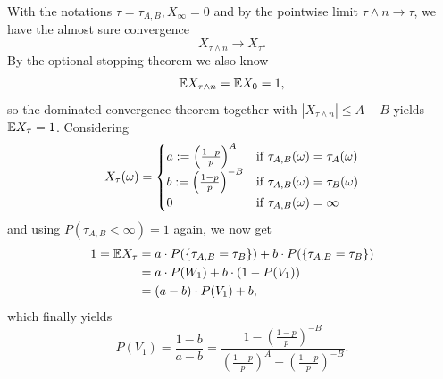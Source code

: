 \documentclass[12pt]{scrartcl}
\begin{document}
With the notations $\tau=\tau_{A,B}, X_{\infty}=0$ and by the pointwise limit $\tau\land n \rightarrow \tau$, we have the almost sure convergence
$$X_{\tau\land n}\rightarrow X_{\tau}.$$
By the optional stopping theorem we also know
$$\mathbb{E} X_{\tau\land n}=\mathbb{E} X_0 = 1,$$
so the dominated convergence theorem together with $|X_{\tau\land n}|\le A+B$ yields $\mathbb{E} X_{\tau}=1$.
Considering
$$X_{\tau}(\omega)=\begin{cases}
	a := \left(\frac{1-p}{p}\right)^A & \text{if } \tau_{A,B}(\omega)=\tau_A(\omega) \\
	b := \left(\frac{1-p}{p}\right)^{-B} & \text{if } \tau_{A,B}(\omega)=\tau_B(\omega) \\
	0 & \text{if } \tau_{A,B}(\omega)=\infty
\end{cases}$$
and using $P(\tau_{A,B}<\infty)=1$ again, we now get
\begin{align*}
1 = \mathbb{E} X_\tau
&= a\cdot P(\{\tau_{A,B}=\tau_B\}) + b\cdot P(\{\tau_{A,B}=\tau_B\}) \\
&= a\cdot P(W_1)+ b\cdot (1-P(V_1)) \\
&= (a-b)\cdot P(V_1) + b,
\end{align*}
which finally yields
$$P(V_1)=\frac{1-b}{a-b}=\frac{1-\left(\frac{1-p}{p}\right)^{-B}}
{\left(\frac{1-p}{p}\right)^A - \left(\frac{1-p}{p}\right)^{-B}}.$$

\ausruecken
	
\end{document}
